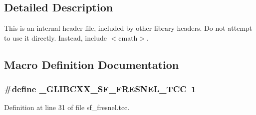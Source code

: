 \subsection{Detailed Description}
This is an internal header file, included by other library headers. Do not attempt to use it directly. Instead, include $<$cmath$>$. 

\subsection{Macro Definition Documentation}
\hypertarget{sf__fresnel_8tcc_a157a41147fba868fe64f89d64525188e}{}
\subsubsection[{\+\_\+\+G\+L\+I\+B\+C\+X\+X\+\_\+\+S\+F\+\_\+\+F\+R\+E\+S\+N\+E\+L\+\_\+\+T\+C\+C}]{\setlength{\rightskip}{0pt plus 5cm}\#define \+\_\+\+G\+L\+I\+B\+C\+X\+X\+\_\+\+S\+F\+\_\+\+F\+R\+E\+S\+N\+E\+L\+\_\+\+T\+C\+C~1}\label{sf__fresnel_8tcc_a157a41147fba868fe64f89d64525188e}


Definition at line 31 of file sf\+\_\+fresnel.\+tcc.

